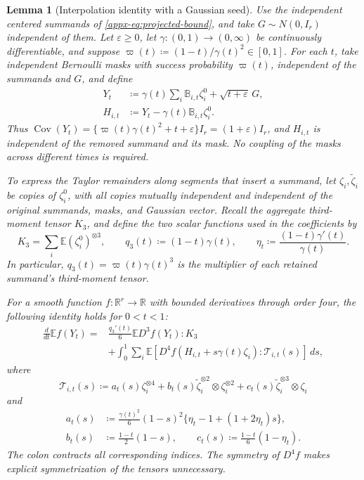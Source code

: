 \documentclass[11pt,letterpaper]{article}
\newtheorem{lemma}{Lemma}
\theoremstyle{remark}
\newcommand{\E}{\mathbb E}
\newcommand{\R}{\mathbb R}
\newcommand{\Cov}{\operatorname{Cov}}
\newcommand{\dd}{\,d}
\begin{document}
\begin{lemma}[Interpolation identity with a Gaussian seed]
\label{appx-an:lem:identity}
Use the independent centered summands of
\eqref{appx-eq:projected-bound}, and take \(G\sim N(0,I_r)\)
independent of them. Let \(\varepsilon\ge0\), let
\(\gamma:(0,1)\to(0,\infty)\) be continuously differentiable, and
suppose
\(\varpi(t)\coloneqq(1-t)/\gamma(t)^2\in[0,1]\).
For each \(t\), take independent Bernoulli masks with success
probability \(\varpi(t)\), independent of the summands and \(G\),
and define
\begin{equation}
 \begin{aligned}
 Y_t&\coloneqq\gamma(t)\sum_i\mathbb B_{i,t}\zeta_i^0
                    +\sqrt{t+\varepsilon}\,G,\\
 H_{i,t}&\coloneqq Y_t-\gamma(t)\mathbb B_{i,t}\zeta_i^0.
 \end{aligned}
 \label{eq:interpolation-family}
\end{equation}
Thus \(\Cov(Y_t)=\{\varpi(t)\gamma(t)^2+t+\varepsilon\}I_r
=(1+\varepsilon)I_r\), and \(H_{i,t}\) is independent of the
removed summand and its mask. No coupling of the masks across
different times is required.

To express the Taylor remainders along segments that insert a
summand, let \(\zeta_i,\widetilde\zeta_i\) be copies of
\(\zeta_i^0\), with all copies mutually independent and independent
of the original summands, masks, and Gaussian vector. Recall the
aggregate third-moment tensor \(K_3\), and define the two scalar
functions used in the coefficients by
\[
 K_3=\sum_i\E(\zeta_i^0)^{\otimes3},\qquad
 q_3(t)\coloneqq(1-t)\gamma(t),\qquad
 \eta_t\coloneqq\frac{(1-t)\gamma'(t)}{\gamma(t)}.
\]
In particular, \(q_3(t)=\varpi(t)\gamma(t)^3\) is the multiplier
of each retained summand's third-moment tensor.

For a smooth function \(f:\R^r\to\R\) with bounded derivatives
through order four, the following identity holds for \(0<t<1\):
\begin{equation}
 \begin{aligned}
 \frac{d}{dt}\E f(Y_t)
 ={}&\frac{q_3'(t)}6\E D^3f(Y_t):K_3\\
 &+\int_0^1\sum_i\E\!\left[
       D^4f(H_{i,t}+s\gamma(t)\zeta_i):\mathcal T_{i,t}(s)
     \right]\dd s,
 \end{aligned}
 \label{appx-an:fourth-identity}
\end{equation}
where
\[
 \mathcal T_{i,t}(s)\coloneqq
 a_t(s)\zeta_i^{\otimes4}
 +b_t(s)\widetilde\zeta_i^{\otimes2}\otimes\zeta_i^{\otimes2}
 +c_t(s)\widetilde\zeta_i^{\otimes3}\otimes\zeta_i
\]
and
\begin{equation}
 \begin{aligned}
 a_t(s)&\coloneqq\frac{\gamma(t)^2}{6}(1-s)^2
                   \{\eta_t-1+(1+2\eta_t)s\},\\
 b_t(s)&\coloneqq\frac{1-t}{2}(1-s),\qquad
 c_t(s)\coloneqq\frac{1-t}{6}(1-\eta_t).
 \end{aligned}
 \label{appx-an:kernel}
\end{equation}
The colon contracts all corresponding indices. The symmetry of
\(D^4f\) makes explicit symmetrization of the tensors unnecessary.
\end{lemma}
\end{document}
